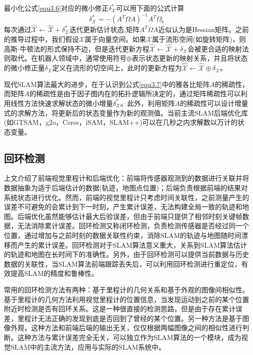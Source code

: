最小化公式\eqref{equ3.6}对应的微小修正$\delta_\mathcal{X}^* $可以用下面的公式计算
\begin{equation}
\label{equ3.7}
\delta_\mathcal{X}^* = - \left( A^T \Omega A \right)^{-1} A^T \Omega_b
\end{equation}
每次通过$\hat{\mathcal{X}} \leftarrow \hat{\mathcal{X}}+\delta_\mathcal{X}^*$迭代更新估计状态,矩阵$A^T \Omega A$近似认为是Hessian矩阵。之前的推导过程中，我们假设$\mathcal{X}$属于向量空间。如果$\mathcal{X}$属于流形空间(如旋转矩阵)，则高斯-牛顿法的形式保持不边，但是迭代更新方程$\hat{\mathcal{X}} \leftarrow \hat{\mathcal{X}}+\delta_\mathcal{X}$会被更合适的映射法则\upcite{[3.5]}取代。在机器人领域中，通常使用符号$\oplus$表示状态更新的映射关系，并且将状态的微小修正量$\delta_\mathcal{X}$定义在流形的切空间上，此时的更新方程为$\hat{\mathcal{X}}  \leftarrow \hat{\mathcal{X}} \oplus \delta_\mathcal{X}$。

现代SLAM算法最大的进步，在于认识到公式\eqref{equ3.7}中的雅各比矩阵$A$的稀疏性，而矩阵$A$的稀疏性是由于因子图内在的拓扑逻辑所决定的，通过矩阵稀疏性可以利用线性方法快速求解状态的微小增量$\delta_\mathcal{X}^*$。此外，利用矩阵$A$的稀疏性可以设计增量式的求解方法，将更新后的状态变量作为新的观测值。当前主流SLAM后端优化库(如GTSAM，g2o，Ceres，iSAM，SLAM++)可以在几秒之内求解数以万计的状态变量。


\subsection{回环检测}
上文介绍了前端视觉里程计和后端优化：前端将传感器观测到的数据进行关联并将数据抽象为适于后端估计的数据(轨迹，地图点位置)；后端负责根据前端的结果对系统状态进行优化。然而，前端的视觉里程计只考虑时间关联性，之前测量产生的误差不可避免的会累计到下一时刻，产生累计误差，无法构建全局一致的轨迹和地图。后端优化虽然能够估计最大后验误差，但由于前端只提供了相邻时刻关键帧数据，无法消除累计误差。回环检测又称闭环检测，负责检测传感器是否经过同一个位置，通过增加与之前时刻的数据关联性约束，消除SLAM的轨迹与地图随时间漂移而产生的累计误差。回环检测对于SLAM算法意义重大，关系到SLAM算法估计的轨迹和地图在长时间下的准确性。另外，由于回环检测可以提供当前数据与历史数据的关联性，当SLAM算法前端跟踪丢失后，可以利用回环检测进行重定位，有效提高SLAM的精度和鲁棒性。

常用的回环检测方法有两种\upcite{[3.7]}：基于里程计的几何关系和基于外观的图像间相似性。基于里程计的几何方法利用视觉里程计的位置信息，当发现运动到之前的某个位置附近时检测是否有回环关系。这是一种很直接的检测思路，但是由于存在累计误差，里程计无法正确的发现到底是否回到了曾经的某个位置。另一种方法是基于图像外观，这种方法和前端后端的输出无关，仅仅根据两幅图像之间的相似性进行判断。这种方法与累计误差完全无关，可以独立作为SLAM算法的一个模块，成为视觉SLAM中的主流方法，应用与实际的SLAM系统中。


